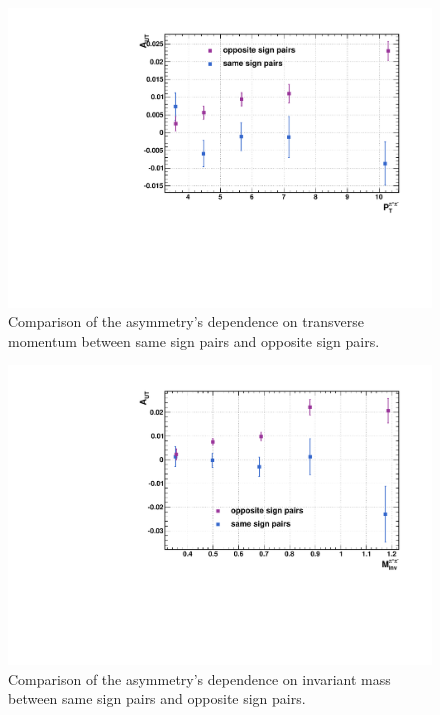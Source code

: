 \documentclass[abstract = on,listof=totoc, bibliography=totoc]{scrreprt}
\begin{document}
\begin{figure}[b!]
\begin{center}
\includegraphics[width = .7\textwidth]{asymVsPt_SameOpp}
\caption[comparison of $P_T$ asymmetry between same sign and opposite sign pairs]{Comparison of the asymmetry's dependence on transverse momentum between same sign pairs and opposite sign pairs.}
\label{fig:samesignPt}
\end{center}
\end{figure}

\begin{figure}
\begin{center}
\includegraphics[width = .7\textwidth]{asymVsMass_SameOpp}
\caption[comparison of $M_{inv}$ asymmetry between same sign and opposite sign pairs]{Comparison of the asymmetry's dependence on invariant mass between same sign pairs and opposite sign pairs.}
\label{fig:samesignMass}
\end{center}
\end{figure}
\end{document}
